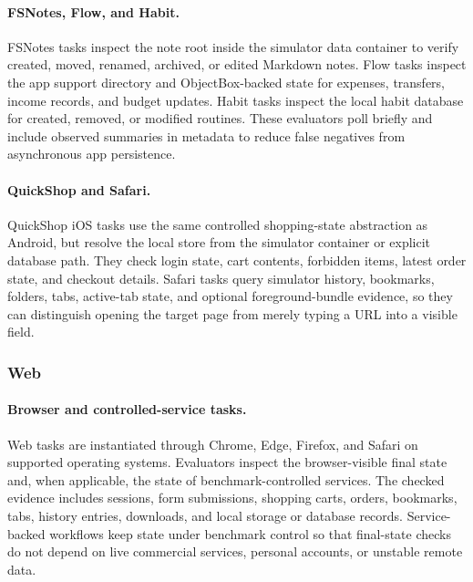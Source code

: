 \paragraph{FSNotes, Flow, and Habit.}
FSNotes tasks inspect the note root inside the simulator data container to verify created, moved, renamed, archived, or edited Markdown notes. Flow tasks inspect the app support directory and ObjectBox-backed state for expenses, transfers, income records, and budget updates. Habit tasks inspect the local habit database for created, removed, or modified routines. These evaluators poll briefly and include observed summaries in metadata to reduce false negatives from asynchronous app persistence.

\paragraph{QuickShop and Safari.}
QuickShop iOS tasks use the same controlled shopping-state abstraction as Android, but resolve the local store from the simulator container or explicit database path. They check login state, cart contents, forbidden items, latest order state, and checkout details. Safari tasks query simulator history, bookmarks, folders, tabs, active-tab state, and optional foreground-bundle evidence, so they can distinguish opening the target page from merely typing a URL into a visible field.

\subsubsection{Web}
\paragraph{Browser and controlled-service tasks.}
Web tasks are instantiated through Chrome, Edge, Firefox, and Safari on supported operating systems. Evaluators inspect the browser-visible final state and, when applicable, the state of benchmark-controlled services. The checked evidence includes sessions, form submissions, shopping carts, orders, bookmarks, tabs, history entries, downloads, and local storage or database records. Service-backed workflows keep state under benchmark control so that final-state checks do not depend on live commercial services, personal accounts, or unstable remote data.

